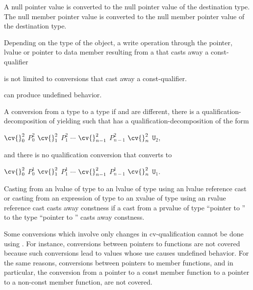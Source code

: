 \pnum
A null pointer value is converted to the null pointer
value of the destination type. The null member pointer
value is converted to the null member pointer value of
the destination type.

\pnum
\begin{note}
Depending on the type of the object, a write operation through the
pointer, lvalue or pointer to data member resulting from a
 that casts away a const-qualifier
\begin{footnote}
is not limited to conversions that cast away a
const-qualifier.
\end{footnote}
can produce undefined behavior.
\end{note}

\pnum
{}%
A conversion from a type  to a type 
if  and  are different,
there is a qualification-decomposition of 
yielding  such that
 has a qualification-decomposition of the form
\begin{indented}
$\cv{}_0^2$ $P_0^2$ $\cv{}_1^2$ $P_1^2$ $\cdots$ $\cv{}_{n-1}^2$ $P_{n-1}^2$ $\cv{}_n^2$ $\mathtt{U}_2$,
\end{indented}
and there is no qualification conversion that converts  to
\begin{indented}
$\cv{}_0^2$ $P_0^1$ $\cv{}_1^2$ $P_1^1$ $\cdots$ $\cv{}_{n-1}^2$ $P_{n-1}^1$ $\cv{}_n^2$ $\mathtt{U}_1$.
\end{indented}

\pnum
Casting from an lvalue of type  to an lvalue of type
 using an lvalue reference cast
or casting from an expression of type  to an xvalue of type  using
an rvalue reference cast
casts away constness if a cast from a prvalue of type ``pointer to '' to the type ``pointer to
'' casts away constness.

\pnum
\begin{note}
Some conversions which involve only changes in cv-qualification cannot
be done using . For instance, conversions between
pointers to functions are not covered because such conversions lead to
values whose use causes undefined behavior. For the same reasons,
conversions between pointers to member functions, and in particular, the
conversion from a pointer to a const member function to a pointer to a
non-const member function, are not covered.
\end{note}

